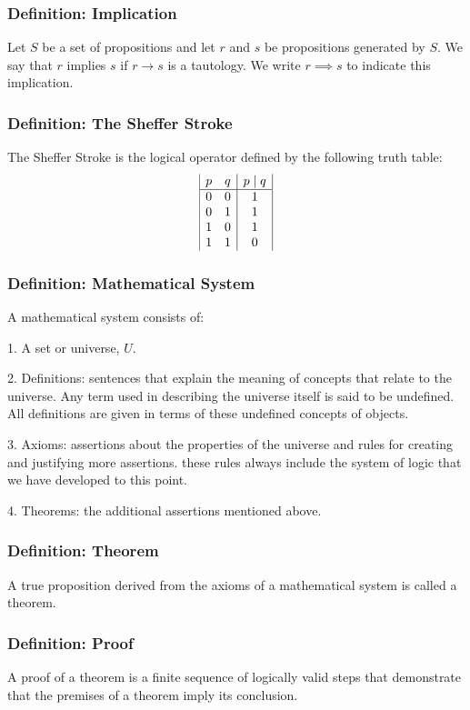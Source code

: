 \documentclass{article}
\begin{document}
\subsubsection*{Definition: Implication}
Let $S$ be a set of propositions and let $r$ and $s$ be propositions generated by $S$. We say that $r$ implies $s$ if $r \rightarrow s$ is a tautology. We write $r \implies s$ to indicate this implication. 

\subsubsection*{Definition: The Sheffer Stroke}
The Sheffer Stroke is the logical operator defined by the following truth table: 
$$\begin{array}{|c c|c|}
p & q & p \mid q \\
\hline
0 & 0 & 1\\
0 & 1 & 1\\
1 & 0 & 1\\
1 & 1 & 0\\
\end{array}$$

\subsubsection*{Definition: Mathematical System}
A mathematical system consists of:

1. A set or universe, $U$.

2. Definitions: sentences that explain the meaning of concepts that relate to the universe. Any term used in describing the universe itself is said to be undefined. All definitions are given in terms of these undefined concepts of objects.

3. Axioms: assertions about the properties of the universe and rules for creating and justifying more assertions. these rules always include the system of logic that we have developed to this point. 

4. Theorems: the additional assertions mentioned above. 

\subsubsection*{Definition: Theorem}
A true proposition derived from the axioms of a mathematical system is called a theorem.

\subsubsection*{Definition: Proof}
A proof of a theorem is a finite sequence of logically valid steps that demonstrate that the premises of a theorem imply its conclusion. 
\end{document}
